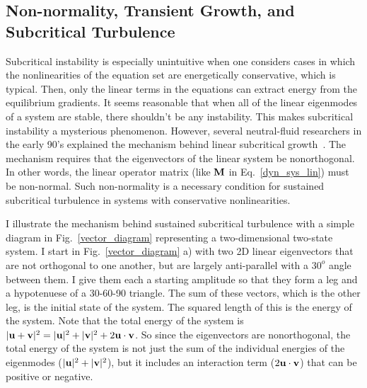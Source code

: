 \subsection{Non-normality, Transient Growth, and Subcritical Turbulence}
\label{s_nonormality}

Subcritical instability is especially unintuitive when one considers cases in which the nonlinearities of the equation set are energetically conservative, which is typical. Then, only
the linear terms in the equations can extract energy from the equilibrium gradients. It seems reasonable that when all of the linear eigenmodes of a system are stable, there shouldn't be
any instability. This makes subcritical instability a mysterious phenomenon. However, several neutral-fluid researchers in the early 90's explained the mechanism behind linear subcritical
growth~\cite{gustavsson1991,butler1992,reddy1993,reddy1993b,trefethen1993,henningson1994,henningson1996}. The mechanism requires that the eigenvectors of the linear system be nonorthogonal.
In other words, the linear operator matrix (like ${\bf M}$ in Eq.~\ref{dyn_sys_lin}) must be non-normal. 
Such non-normality is a necessary condition for sustained subcritical turbulence in systems with conservative nonlinearities.

I illustrate the mechanism behind sustained subcritical turbulence with a simple diagram in Fig.~\ref{vector_diagram} representing a two-dimensional two-state system. 
I start in Fig.~\ref{vector_diagram} a) with two 2D linear eigenvectors that are not orthogonal to one another, but are largely anti-parallel with a $30^o$ angle between them. 
I give them each a starting amplitude so that they form a leg and a hypotenuese of a 30-60-90 triangle. The sum of these vectors, which is the other leg, is the initial state of the system.
The squared length of this is the energy of the system. Note that the total energy of the system is $|{\bf u} + {\bf v}|^2 = |{\bf u}|^2 + |{\bf v}|^2 + 2 {\bf u} \cdot {\bf v}$. So since the
eigenvectors are nonorthogonal, the total energy of the system is not just the sum of the individual energies of the eigenmodes ($|{\bf u}|^2 + |{\bf v}|^2$), but it includes an interaction
term ($2 {\bf u} \cdot {\bf v}$) that can be positive or negative.

